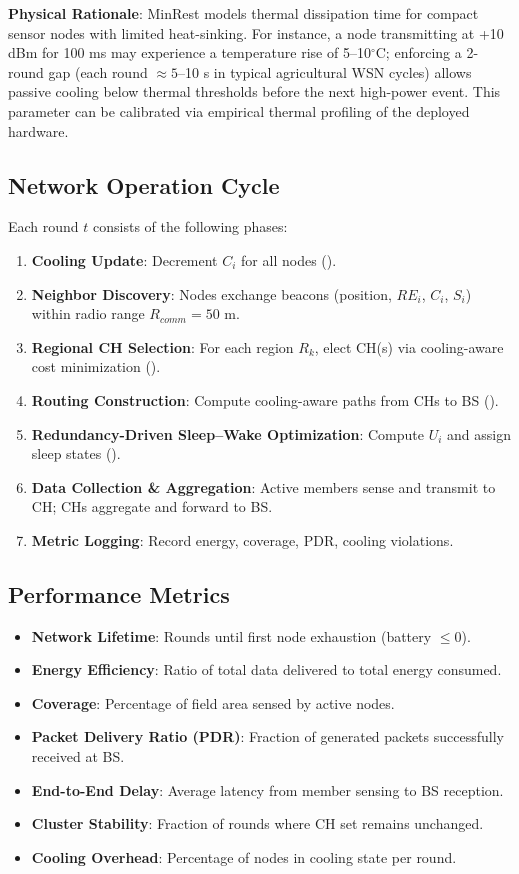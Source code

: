 \textbf{Physical Rationale}: MinRest models thermal dissipation time for compact sensor nodes with limited heat-sinking. For instance, a node transmitting at +10 dBm for 100 ms may experience a temperature rise of 5--10$^\circ$C; enforcing a 2-round gap (each round $\approx 5$--10 s in typical agricultural WSN cycles) allows passive cooling below thermal thresholds before the next high-power event. This parameter can be calibrated via empirical thermal profiling of the deployed hardware.

\subsection{Network Operation Cycle}
Each round $t$ consists of the following phases:
\begin{enumerate}[label=\textbf{Phase \arabic*:},noitemsep]
  \item \textbf{Cooling Update}: Decrement $C_i$ for all nodes ().
  \item \textbf{Neighbor Discovery}: Nodes exchange beacons (position, $RE_i$, $C_i$, $S_i$) within radio range $R_{comm}=50$ m.
  \item \textbf{Regional CH Selection}: For each region $R_k$, elect CH(s) via cooling-aware cost minimization ().
  \item \textbf{Routing Construction}: Compute cooling-aware paths from CHs to BS ().
  \item \textbf{Redundancy-Driven Sleep--Wake Optimization}: Compute $U_i$ and assign sleep states ().
  \item \textbf{Data Collection \& Aggregation}: Active members sense and transmit to CH; CHs aggregate and forward to BS.
  \item \textbf{Metric Logging}: Record energy, coverage, PDR, cooling violations.
\end{enumerate}

\subsection{Performance Metrics}
\begin{itemize}[noitemsep]
  \item \textbf{Network Lifetime}: Rounds until first node exhaustion (battery $\le 0$).
  \item \textbf{Energy Efficiency}: Ratio of total data delivered to total energy consumed.
  \item \textbf{Coverage}: Percentage of field area sensed by active nodes.
  \item \textbf{Packet Delivery Ratio (PDR)}: Fraction of generated packets successfully received at BS.
  \item \textbf{End-to-End Delay}: Average latency from member sensing to BS reception.
  \item \textbf{Cluster Stability}: Fraction of rounds where CH set remains unchanged.
  \item \textbf{Cooling Overhead}: Percentage of nodes in cooling state per round.
\end{itemize}
